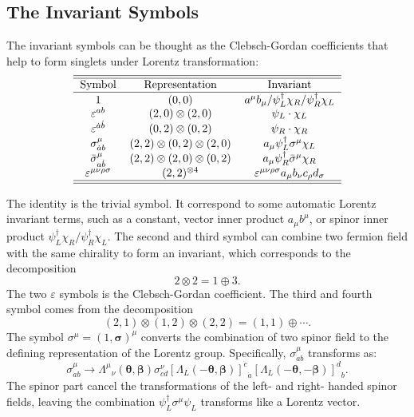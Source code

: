 \documentclass[aps,prb,superscriptaddress,nofootinbib]{revtex4}
\begin{document}
\subsection{The Invariant Symbols}
The invariant symbols can be thought as the Clebsch-Gordan coefficients that help to form singlets under Lorentz transformation: 
\begin{equation*}
\begin{tabular}{ccc}
	\hline \hline 
	Symbol & Representation  & Invariant \\ \hline
	$1$ & $(0,0)$ & $a^\mu b_\mu /\psi_L^\dagger \chi_R/\psi_R^\dagger \chi_L$\\
	$\varepsilon^{ab}$ & $(2,0)\otimes (2,0)$ & $\psi_L \cdot \chi_L$ \\
	$\varepsilon^{\dot a \dot b}$ & $(0,2)\otimes (0,2)$ & $\psi_R \cdot \chi_R$ \\
	$\sigma^\mu_{\dot ab}$ & $(2,2)\otimes (0,2)\otimes(2,0)$ & $a_\mu \psi_L^\dagger \sigma^\mu \chi_L$ \\
	$\bar \sigma^\mu_{a \dot b}$ & $(2,2)\otimes (2,0)\otimes(0,2)$ & $a_\mu \psi_R^\dagger \bar\sigma^\mu \chi_R$ \\
	$\varepsilon^{\mu\nu\rho\sigma}$ & $(2,2)^{\otimes 4}$ & $\varepsilon^{\mu\nu\rho\sigma}a_\mu b_\nu c_\rho d_\sigma$ \\
	\hline \hline
\end{tabular}
\end{equation*}

The identity is the trivial symbol.
It correspond to some automatic Lorentz invariant terms, such as a constant, vector inner product $a_\mu b^\mu$, or spinor inner product $\psi_L^\dagger \chi_R/\psi_R^\dagger \chi_L$.
The second and third symbol can combine two fermion field with the same chirality to form an invariant, which corresponds to the decomposition 
\begin{equation}
	2 \otimes 2 = 1 \oplus 3.
\end{equation}
The two $\varepsilon$ symbols is the Clebsch-Gordan coefficient.
The third and fourth symbol comes from the decomposition
\begin{equation}
	\left(2, 1\right) \otimes \left(1,2\right) \otimes \left(2, 2\right)
	= \left(1, 1\right) \oplus \cdots.
\end{equation}
The symbol $\sigma^\mu = (1, \bm \sigma)^\mu$ converts the combination of two spinor field to the defining representation of the Lorentz group.
Specifically, $\sigma^\mu_{\dot a b}$ transforms as:
\begin{equation}\label{eq:RFT-sigma_symbol}
	\sigma^\mu_{\dot a b} \rightarrow
	{\Lambda^\mu}_\nu(\bm\theta,\bm\beta) \sigma^\nu_{\dot c d}
	{\left[\Lambda_L(-\bm\theta, \bm\beta)\right]^{\dot c}}_{\dot a} {\left[\Lambda_L(-\bm\theta, -\bm\beta)\right]^d}_b.
\end{equation}
The spinor part cancel the transformations of the left- and right- handed spinor fields, leaving the combination $\psi_L^\dagger \sigma^\mu \psi_L$ transforms like a Lorentz vector.
\end{document}
